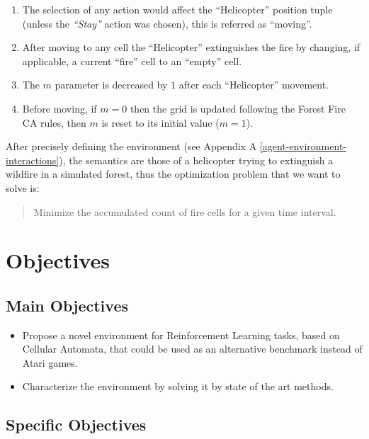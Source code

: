 \documentclass[
  12pt,
  openany]{book}
\providecommand{\tightlist}{%
  \setlength{\itemsep}{0pt}\setlength{\parskip}{0pt}}
\begin{document}
\begin{enumerate}
\def\labelenumi{\arabic{enumi}.}
\tightlist
\item
  The selection of any action would affect the ``Helicopter'' position tuple (unless the \emph{``Stay''} action was chosen), this is referred as ``moving''.
\item
  After moving to any cell the ``Helicopter'' extinguishes the fire by changing, if applicable, a current ``fire'' cell to an ``empty'' cell.
\item
  The \(m\) parameter is decreased by \(1\) after each ``Helicopter'' movement.
\item
  Before moving, if \(m=0\) then the grid is updated following the Forest Fire CA rules, then \(m\) is reset to its initial value (\(m=1\)).
\end{enumerate}

After precisely defining the environment (see Appendix A \ref{agent-environment-interactions}), the semantics are those of a helicopter trying to extinguish a wildfire in a simulated forest, thus the optimization problem that we want to solve is:

\begin{quote}
Minimize the accumulated count of fire cells for a given time interval.
\end{quote}

\hypertarget{objectives}{%
\section{Objectives}\label{objectives}}

\hypertarget{main-objectives}{%
\subsection{Main Objectives}\label{main-objectives}}

\begin{itemize}
\tightlist
\item
  Propose a novel environment for Reinforcement Learning tasks, based on Cellular Automata, that could be used as an alternative benchmark instead of Atari games.
\item
  Characterize the environment by solving it by state of the art methods.
\end{itemize}

\hypertarget{specific-objectives}{%
\subsection{Specific Objectives}\label{specific-objectives}}
\end{document}

